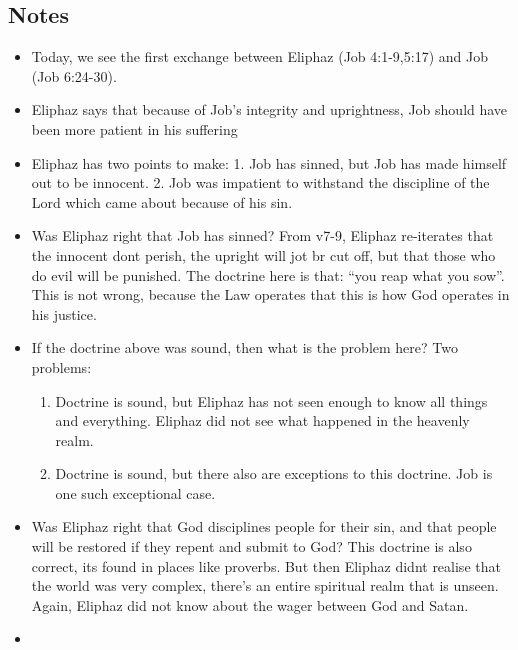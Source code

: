\subsection*{Notes}
\begin{itemize}
  \item{Today, we see the first exchange between Eliphaz (Job 4:1-9,5:17) and Job (Job 6:24-30).}
  \item{Eliphaz says that because of Job’s integrity and uprightness, Job should have been more patient in his suffering}
  \item{Eliphaz has two points to make: 1. Job has sinned, but Job has made himself out to be innocent. 2. Job was impatient to withstand the discipline of the Lord which came about because of his sin.}
  \item{Was Eliphaz right that Job has sinned? From v7-9, Eliphaz re-iterates that the innocent dont perish, the upright will jot br cut off, but that those who do evil will be punished. The doctrine here is that: “you reap what you sow”. This is not wrong, because the Law operates that this is how God operates in his justice. }
  \item{If the doctrine above was sound, then what is the problem here? Two problems:
  \begin{enumerate}
    \item{Doctrine is sound, but Eliphaz has not seen enough to know all things and everything. Eliphaz did not see what happened in the heavenly realm.}
    \item{Doctrine is sound, but there also are exceptions to this doctrine. Job is one such exceptional case.} 
  \end{enumerate} 
  }
  \item{Was Eliphaz right that God disciplines people for their sin, and that people will be restored if they repent and submit to God? This doctrine is also correct, its found in places like proverbs. But then Eliphaz didnt realise that the world was very complex, there’s an entire spiritual realm that is unseen. Again, Eliphaz did not know about the wager between God and Satan.}
  \item{}

\end{itemize}
